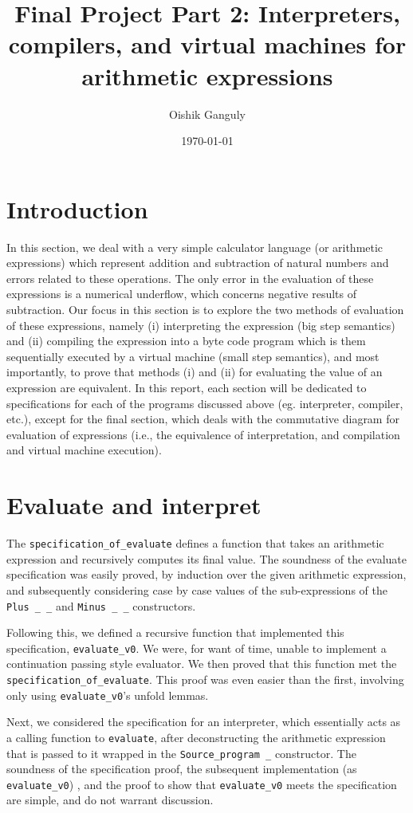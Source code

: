 \documentclass[12pt, a4paper]{article}
\title{Final Project Part 2: Interpreters, compilers, and virtual machines for arithmetic expressions}
\author{Oishik Ganguly}
\date{\today}
\begin{document}
\maketitle
\tableofcontents

\section {Introduction}
In this section, we deal with a very simple calculator language 
(or arithmetic expressions) which represent addition and subtraction of natural 
numbers and errors related to these operations. The only error in the
evaluation of these expressions is a numerical underflow, which concerns negative
results of subtraction. Our focus in this section is to explore the two methods of
evaluation of these expressions, namely (i) interpreting the expression (big step
semantics) and (ii) compiling the expression into a byte code program which
is them sequentially executed by a virtual machine (small step semantics), and most
importantly, to prove that methods (i) and (ii) for evaluating the value of an 
expression are equivalent. In this report, each section will be dedicated to 
specifications for each of the programs discussed above (eg. interpreter, compiler,
etc.), except for the final section, which  deals with the commutative 
diagram for evaluation of expressions (i.e., the equivalence of interpretation, and
compilation and virtual machine execution). 

\section {Evaluate and interpret}
The \verb-specification_of_evaluate-  defines a function that 
takes an arithmetic expression and recursively computes its final value. The
soundness of the evaluate specification was easily proved, by induction over 
the given arithmetic expression, and subsequently considering case by case values
of the sub-expressions of the \verb-Plus _ _- and \verb-Minus _ _- constructors. 

Following this, we defined a recursive function that implemented this specification, 
\verb-evaluate_v0-. We were, for want of time, unable to implement a continuation
passing style evaluator. We then proved that this function met the
\verb-specification_of_evaluate-.  This proof was even easier than the first, involving only using 
\verb-evaluate_v0-'s unfold lemmas. 

Next, we considered the specification for an interpreter, which essentially acts
as a calling function to \verb-evaluate-, after deconstructing the arithmetic 
expression that is passed to it wrapped in the \verb-Source_program _- 
constructor. The soundness of the specification proof, the subsequent implementation
(as \verb-evaluate_v0-) , and the proof to show that \verb-evaluate_v0- meets
the specification are simple, and do not warrant discussion.
\end{document}
